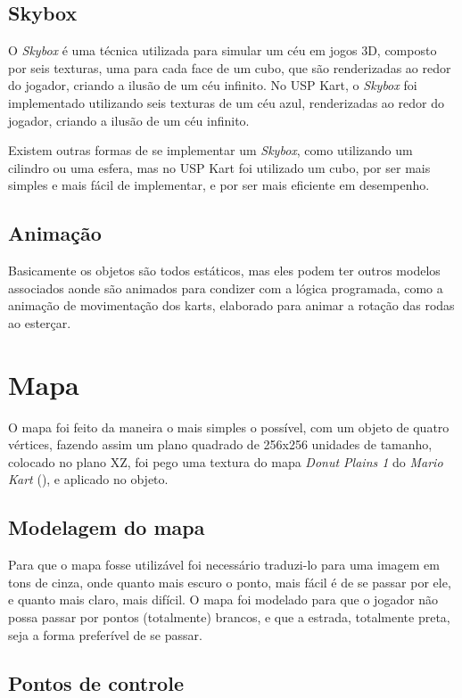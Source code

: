 \subsection{Skybox}

O \textit{Skybox} é uma técnica utilizada para simular um céu em jogos 3D, composto por seis texturas, uma para cada face de um cubo, que são renderizadas ao redor do jogador, criando a ilusão de um céu infinito. No USP Kart, o \textit{Skybox} foi implementado utilizando seis texturas de um céu azul, renderizadas ao redor do jogador, criando a ilusão de um céu infinito.

Existem outras formas de se implementar um \textit{Skybox}, como utilizando um cilindro ou uma esfera, mas no USP Kart foi utilizado um cubo, por ser mais simples e mais fácil de implementar, e por ser mais eficiente em desempenho.

\subsection{Animação}

Basicamente os objetos são todos estáticos, mas eles podem ter outros modelos associados aonde são animados para condizer com a lógica programada, como a animação de movimentação dos karts, elaborado para animar a rotação das rodas ao esterçar.

\section{Mapa}

O mapa foi feito da maneira o mais simples o possível, com um objeto de quatro vértices, fazendo assim um plano quadrado de 256x256 unidades de tamanho, colocado no plano XZ, foi pego uma textura do mapa \textit{Donut Plains 1} do \textit{Mario Kart} (\cite{marioKart}), e aplicado no objeto.

\subsection{Modelagem do mapa}

Para que o mapa fosse utilizável foi necessário traduzi-lo para uma imagem em tons de cinza, onde quanto mais escuro o ponto, mais fácil é de se passar por ele, e quanto mais claro, mais difícil. O mapa foi modelado para que o jogador não possa passar por pontos (totalmente) brancos, e que a estrada, totalmente preta, seja a forma preferível de se passar.
\subsection{Pontos de controle}

